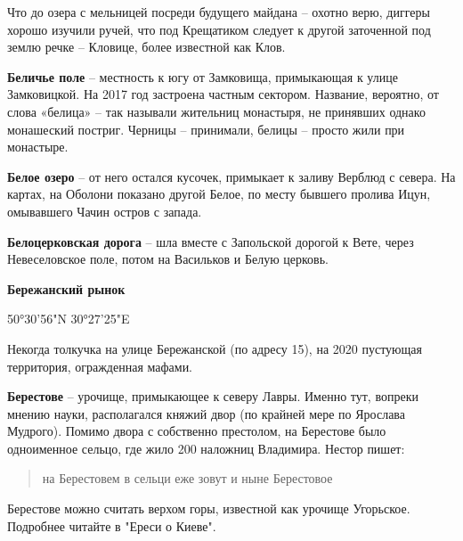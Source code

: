 Что до озера с мельницей посреди будущего майдана – охотно верю, диггеры хорошо изучили ручей, что под Крещатиком следует к другой заточенной под землю речке – Кловице, более известной как Клов.\\

\medskip


\textbf{Беличье поле} – местность к югу от Замковища, примыкающая к улице Замковицкой. На 2017 год застроена частным сектором. Название, вероятно, от слова «белица» – так называли жительниц монастыря, не принявших однако монашеский постриг. Черницы – принимали, белицы – просто жили при монастыре.\\


\medskip






\textbf{Белое озеро} – от него остался кусочек, примыкает к заливу Верблюд с севера. На картах, на Оболони показано другой Белое, по месту бывшего пролива Ицун, омывавшего Чачин остров с запада.\\

\medskip


\textbf{Белоцерковская дорога} – шла вместе с Запольской дорогой к Вете, через Невеселовское поле, потом на Васильков и Белую церковь.\\

\medskip


\textbf{Бережанский рынок}

50°30'56"N 30°27'25"E

Некогда толкучка на улице Бережанской (по адресу 15), на 2020 пустующая территория, огражденная мафами.\\

\medskip


\textbf{Берестове} – урочище, примыкающее к северу Лавры. Именно тут, вопреки мнению науки, располагался княжий двор (по крайней мере по Ярослава Мудрого). Помимо двора с собственно престолом, на Берестове было одноименное сельцо, где жило 200 наложниц Владимира. Нестор пишет:

\begin{quotation}
на Берестовем в сельци еже зовут и ныне Берестовое
\end{quotation}

Берестове можно считать верхом горы, известной как урочище Угорьское. Подробнее читайте в "Ереси о Киеве".\\

